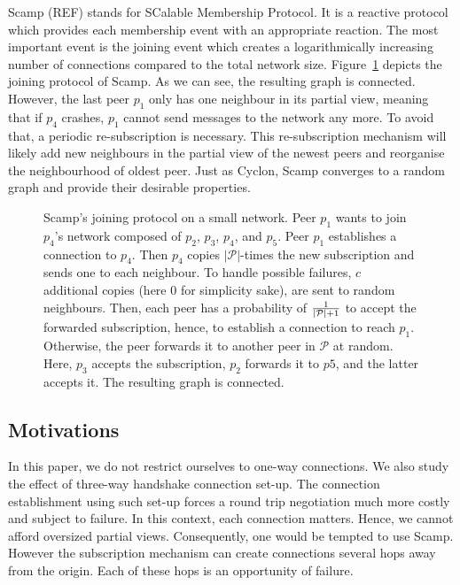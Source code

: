 \begin{asparadesc}
\item [Scamp] (REF) stands for SCalable Membership Protocol. It is a reactive
  protocol which provides each membership event with an appropriate reaction.
  The most important event is the joining event which creates a logarithmically
  increasing number of connections compared to the total network size.
  Figure~\ref{fig:scampexample} depicts the joining protocol of Scamp. As we
  can see, the resulting graph is connected. However, the last peer $p_1$ only
  has one neighbour in its partial view, meaning that if $p_4$ crashes, $p_1$
  cannot send messages to the network any more. To avoid that, a periodic
  re-subscription is necessary. This re-subscription mechanism will likely add
  new neighbours in the partial view of the newest peers and reorganise the
  neighbourhood of oldest peer. Just as Cyclon, Scamp converges to a random
  graph and provide their desirable properties.
\end{asparadesc}

\begin{figure}
  \centering
  
  \caption{\label{fig:scampexample} Scamp's joining protocol on a small
    network. Peer $p_1$ wants to join $p_4$'s network composed of $p_2$,
    $p_3$, $p_4$, and $p_5$. Peer $p_1$ establishes a connection to $p_4$. Then
    $p_4$ copies $|\mathcal{P}|$-times the new subscription and sends one to
    each neighbour. To handle possible failures, $c$ additional copies (here
    $0$ for simplicity sake), are sent to random neighbours. Then, each peer
    has a probability of $1\over{|\mathcal{P}|+1}$ to accept the forwarded
    subscription, hence, to establish a connection to reach $p_1$. Otherwise,
    the peer forwards it to another peer in $\mathcal{P}$ at random. Here,
    $p_3$ accepts the subscription, $p_2$ forwards it to $p5$, and the latter
    accepts it. The resulting graph is connected.}
\end{figure}

\subsection{Motivations}
In this paper, we do not restrict ourselves to one-way connections. We also
study the effect of three-way handshake connection set-up. The connection
establishment using such set-up forces a round trip negotiation much more
costly and subject to failure. In this context, each connection matters. Hence,
we cannot afford oversized partial views. Consequently, one would be tempted to
use Scamp. However the subscription mechanism can create connections several
hops away from the origin. Each of these hops is an opportunity of failure.


